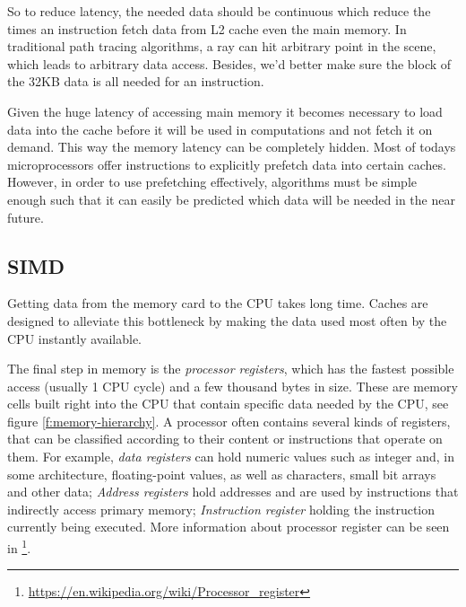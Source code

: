 So to reduce latency, the needed data should be continuous which reduce the times an instruction fetch data from L2 cache even the main memory. In traditional path tracing algorithms, a ray can hit arbitrary point in the scene, which leads to arbitrary data access. Besides, we'd better make sure the block of the 32KB data is all needed for an instruction.

Given the huge latency of accessing main memory it becomes necessary to load data into the cache before it will be used in computations and not fetch it on demand. This way the memory latency can be completely hidden. Most of todays microprocessors offer instructions to explicitly prefetch data into certain caches. However, in order to use prefetching effectively, algorithms must be simple enough such that it can easily be predicted which data will be needed in the near future.



\subsection{SIMD}
Getting data from the memory card to the CPU takes long time. Caches are designed to alleviate this bottleneck by making the data used most often by the CPU instantly available.

The final step in memory is the \textit{processor registers}, which has the fastest possible access (usually 1 CPU cycle) and a few thousand bytes in size. These are memory cells built right into the CPU that contain specific data needed by the CPU, see figure \ref{f:memory-hierarchy}. A processor often contains several kinds of registers, that can be classified according to their content or instructions that operate on them. For example, \textit{data registers} can hold numeric values such as integer and, in some architecture, floating-point values, as well as characters, small bit arrays and other data; \textit{Address registers} hold addresses and are used by instructions that indirectly access primary memory; \textit{Instruction register} holding the instruction currently being executed. More information about processor register can be seen in \footnote{\url{https://en.wikipedia.org/wiki/Processor_register}}.

